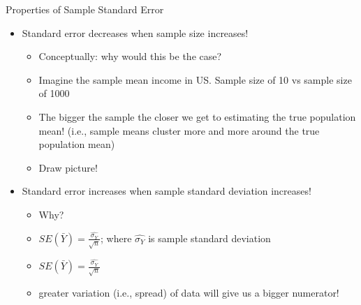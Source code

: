 \documentclass[
  8pt,
  ignorenonframetext,
  dvipsnames]{beamer}
\providecommand{\tightlist}{%
  \setlength{\itemsep}{0pt}\setlength{\parskip}{0pt}}
\let\olditem\item
\renewcommand{\item}{%
  \olditem\vspace{4pt}
}
\begin{document}
\begin{frame}{Properties of Sample Standard Error}
\protect\hypertarget{properties-of-sample-standard-error}{}

\begin{itemize}
\tightlist
\item
  Standard error decreases when sample size increases!

  \begin{itemize}
  \tightlist
  \item
    Conceptually: why would this be the case?
  \item
    Imagine the sample mean income in US. Sample size of 10 vs sample
    size of 1000
  \item
    The bigger the sample the closer we get to estimating the true
    population mean! (i.e., sample means cluster more and more around
    the true population mean)
  \item
    Draw picture!
  \end{itemize}
\end{itemize}

\medskip

\begin{itemize}
\tightlist
\item
  Standard error increases when sample standard deviation increases!

  \begin{itemize}
  \tightlist
  \item
    Why?
  \item
    \(SE(\bar{Y}) = \frac{\hat{\sigma_Y}}{\sqrt{n}}\); where
    \(\hat{\sigma_Y}\) is sample standard deviation
  \item
    \(SE(\bar{Y}) = \frac{\hat{\sigma_Y}}{\sqrt{n}}\)
  \item
    greater variation (i.e., spread) of data will give us a bigger
    numerator!
  \end{itemize}
\end{itemize}

\end{frame}
\end{document}
